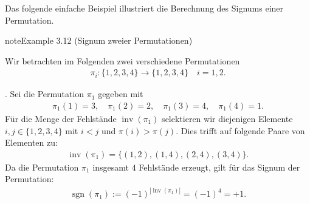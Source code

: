 \documentclass[letterpaper,10pt,german]{jupyterBook}
\begin{document}
\sphinxAtStartPar
Das folgende einfache Beispiel illustriert die Berechnung des Signums einer Permutation.
\label{vektoranalysis/tensor:example-27}
\begin{sphinxadmonition}{note}{Example 3.12 (Signum zweier Permutationen)}



\sphinxAtStartPar
Wir betrachten im Folgenden zwei verschiedene Permutationen
\begin{equation*}
\begin{split}\pi_i \colon \lbrace 1, 2, 3, 4 \rbrace \rightarrow \lbrace 1, 2, 3, 4 \rbrace \quad i=1,2.\end{split}
\end{equation*}


. Sei die Permutation \(\pi_1\) gegeben mit
\begin{equation*}
\begin{split}\pi_1(1) = 3, \quad \pi_1(2) = 2, \quad \pi_1(3) = 4, \quad \pi_1(4) = 1.\end{split}
\end{equation*}
\sphinxAtStartPar
Für die Menge der Fehlstände \(\operatorname{inv}(\pi_1)\) selektieren wir diejenigen Elemente \(i,j \in \lbrace 1,2,3,4 \rbrace\) mit \(i < j\) und \(\pi(i) > \pi(j)\).
Dies trifft auf folgende Paare von Elementen zu:
\begin{equation*}
\begin{split}\operatorname{inv}(\pi_1) = \lbrace (1,2), (1,4), (2,4), (3,4)\rbrace.\end{split}
\end{equation*}
\sphinxAtStartPar
Da die Permutation \(\pi_1\) insgesamt \(4\) Fehlstände erzeugt, gilt für das Signum der Permutation:
\begin{equation*}
\begin{split}\operatorname{sgn}(\pi_1) := (-1)^{|\operatorname{inv}(\pi_1)|} = (-1)^4 = +1.\end{split}
\end{equation*}



\end{sphinxadmonition}
\end{document}
